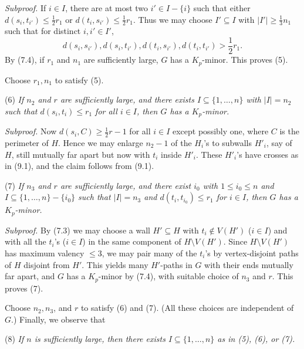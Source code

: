 \textit{Subproof.} If $i \in I$, there are at most two $i' \in I - \{i\}$ such that either $d(s_i, t_{i'}) \le \frac{1}{2}r_1$ or $d(t_i, s_{i'}) \le \frac{1}{2}r_1$. Thus we may choose $I' \subseteq I$ with $|I'| \ge \frac{1}{3}n_1$ such that for distinct $i, i' \in I'$,
\begin{equation*}
d(s_i, s_{i'}), d(s_i, t_{i'}), d(t_i, s_{i'}), d(t_i, t_{i'}) > \frac{1}{2}r_1.
\end{equation*}
By (7.4), if $r_1$ and $n_1$ are sufficiently large, $G$ has a $K_p$-minor. This proves (5).

Choose $r_1, n_1$ to satisfy (5).

\hspace*{12pt}(6) \textit{If $n_2$ and $r$ are sufficiently large, and there exists $I \subseteq \{1, \dots, n\}$ with $|I| = n_2$ such that $d(s_i, t_i) \le r_1$ for all $i \in I$, then $G$ has a $K_p$-minor.}

\textit{Subproof.} Now $d(s_i, C) \ge \frac{1}{2}r - 1$ for all $i \in I$ except possibly one, where $C$ is the perimeter of $H$. Hence we may enlarge $n_2 - 1$ of the $H_i$'s to subwalls $H'_i$, say of $H$, still mutually far apart but now with $t_i$ inside $H'_i$. These $H'_i$'s have crosses as in (9.1), and the claim follows from (9.1).

\hspace*{12pt}(7) \textit{If $n_3$ and $r$ are sufficiently large, and there exist $i_0$ with $1 \le i_0 \le n$ and $I \subseteq \{1, \dots, n\} - \{i_0\}$ such that $|I| = n_3$ and $d(t_i, t_{i_0}) \le r_1$ for $i \in I$, then $G$ has a $K_p$-minor.}

\textit{Subproof.} By (7.3) we may choose a wall $H' \subseteq H$ with $t_i \notin V(H')$ ($i \in I$) and with all the $t_i$'s ($i \in I$) in the same component of $H \setminus V(H')$. Since $H \setminus V(H')$ has maximum valency $\le 3$, we may pair many of the $t_i$'s by vertex-disjoint paths of $H$ disjoint from $H'$. This yields many $H'$-paths in $G$ with their ends mutually far apart, and $G$ has a $K_p$-minor by (7.4), with suitable choice of $n_3$ and $r$. This proves (7).

Choose $n_2, n_3$, and $r$ to satisfy (6) and (7). (All these choices are independent of $G$.) Finally, we observe that

\hspace*{12pt}(8) \textit{If $n$ is sufficiently large, then there exists $I \subseteq \{1, \dots, n\}$ as in (5), (6), or (7).}

